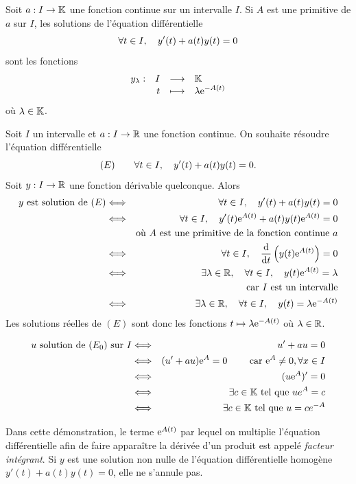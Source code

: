 \documentclass{magnoliaold}
\begin{document}
\begin{proposition}[utile=-3]
Soit $a:I\to\mathbb{K}$ une fonction continue sur un intervalle $I$. Si $A$ est
une primitive de $a$ sur $I$, les solutions de l'équation différentielle
\[\forall t\in I ,\quad y'(t)+a(t)y(t)=0\]
sont les fonctions
\[\begin{array}[t]{lrcl} \displaystyle{y_\lambda} : & \displaystyle{I} & \longrightarrow & \displaystyle{\ensuremath{\mathbb{K}}} \\ & \displaystyle{t} & \longmapsto & \displaystyle{\lambda {\rm e}^{-A(t)}} \end{array}\]
où $\lambda\in\mathbb{K}$.
\end{proposition}

\begin{preuve}
\begin{francois}
Soit $I$ un intervalle et $a:I\to\mathbb{R}$ une fonction continue. On souhaite résoudre l'équation différentielle
\[(E)\qquad\forall t\in I,\quad y'(t)+a(t)y(t)=0.\]
Soit $y:I\to\mathbb{R}$ une fonction dérivable quelconque. Alors
\begin{eqnarray*}
\text{$y$ est solution de $(E)$}
&\Longleftrightarrow& \forall t\in I,\quad y'(t)+a(t)y(t)=0\\
&\Longleftrightarrow& \forall t\in I,\quad y'(t){\rm e}^{A(t)}+a(t)y(t){\rm e}^{A(t)}=0\\
&    & \text{où $A$ est une primitive de la fonction continue $a$}\\
&\Longleftrightarrow& \forall t\in I,\quad \frac{{\rm d}}{{\rm d}t}\left(y(t){\rm e}^{A(t)}\right)=0\\
&\Longleftrightarrow& \exists \lambda\in\mathbb{R},\quad\forall t\in I,\quad y(t){\rm e}^{A(t)}=\lambda\\
&    & \text{car $I$ est un intervalle}\\
&\Longleftrightarrow& \exists \lambda\in\mathbb{R},\quad\forall t\in I,\quad y(t)=\lambda{\rm e}^{-A(t)}
\end{eqnarray*}
Les solutions réelles de $(E)$ sont donc les fonctions $t\mapsto \lambda {\rm e}^{-A(t)}$
où $\lambda\in\mathbb{R}$.
\end{francois}
\begin{victor}
\begin{eqnarray*}
u \text{ solution de } (E_0) \text{ sur } I&\Longleftrightarrow & u'+au=0 \\
&\Longleftrightarrow & (u'+au){\rm e}^A=0 \qquad\text{ car } {\rm e}^A\neq 0, \forall x \in I \\
&\Longleftrightarrow &(u{\rm e}^A)'=0\\
&\Longleftrightarrow & \exists c\in \mathbb{K} \text{ tel que } ue^A=c\\
&\Longleftrightarrow & \exists c\in \mathbb{K} \text{ tel que } u=ce^{-A}
\end{eqnarray*}
\end{victor}
\end{preuve}

\begin{remarques}
\remarque Dans cette démonstration, le terme ${\rm e}^{A(t)}$ par lequel on multiplie l'équation différentielle afin de faire apparaître la dérivée d'un produit est appelé \emph{facteur intégrant}.
\remarque Si $y$ est une solution non nulle de l'équation différentielle homogène $y'(t)+a(t) y(t)=0$, elle ne s'annule pas.
\end{remarques}
\end{document}
